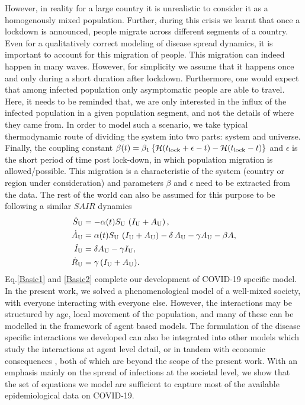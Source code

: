\documentclass[aps,prl,reprint,superscriptaddress]{revtex4-1}
\begin{document}
However, in reality for a large country it is unrealistic to consider it as a homogenously mixed population. Further, during this crisis we learnt that once a lockdown is announced, people migrate across different segments of a country. Even for a qualitatively correct modeling of disease spread dynamics, it is important to account for this migration of people. This migration can indeed happen in many waves. However, for simplicity we assume that it happens once and only during a short duration after lockdown. Furthermore, one would expect that among infected population only asymptomatic people are able to travel.  Here, it needs to be reminded that, we are only interested in the influx of the infected population in a given population segment, and not the details of where they came from. In order to model such a scenario, we take typical thermodynamic route of dividing the system into two parts: system and universe.
Finally, the coupling constant $\beta(t) =  \beta_1 \left\{{\cal H}(t_{\rm lock}+\epsilon - t )-{\cal H}(t_{\rm lock} - t )\right\}$ and $\epsilon$ is the short period of time post lock-down, in which population migration is allowed/possible. This migration is a characteristic of the system (country or region under consideration) and parameters $\beta$ and $\epsilon$ need to be extracted from the data. The rest of the world can also be assumed for this purpose to be following a similar $SAIR$ dynamics
\begin{align}
\label{Basic2}
 \begin{split}
   \dot{S}_{\rm U} &= -\alpha(t) S_{\rm U}  \, \left(I_{\rm U}+A_{\rm U}\right) ,\\
  \dot{A}_{\rm U} &=  \alpha(t) S_{\rm U} \, \left(  I_{\rm U}+   A_{\rm U}\right) -\delta\,  A_{\rm U}-\gamma A_{\rm U}-\beta A,
  \\
  \dot{I}_{\rm U} &=\delta  A_{\rm U}-\gamma I_{\rm U},\\
  \dot{R}_{\rm U} &= \gamma \, (I_{\rm U}+A_{\rm U}).
 \end{split}
\end{align}
 Eq.\eqref{Basic1} and \eqref{Basic2} complete our development of COVID-19 specific model. In the present work, we solved a phenomenological model of a well-mixed society, with everyone interacting with everyone else. However, the interactions may be structured by age, local movement of the population, and many of these can be modelled in the framework of agent based models. The formulation of the disease specific interactions we developed can also be integrated into other models which study the interactions at agent level detail, or in tandem with economic consequences \cite{li2019affine}, both of which are beyond the scope of the present work. With an emphasis mainly on the spread of infections at the societal level, we show that the set of equations we model are sufficient to capture most of the available epidemiological data on COVID-19.
\end{document}
